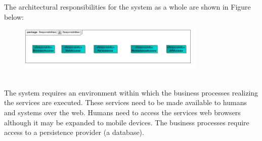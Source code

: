 The architectural responsibilities for the system as a whole are shown in Figure below:\\
\begin{figure}[ht!]
\begin{center}


\includegraphics[width=90mm]{../images/arch_resp.jpg}
\end{center}
\end{figure}\\
The system requires an environment within which the business processes realizing the services
are executed. These services need to be made available to humans and systems over the web. Humans need to access the services web browsers although it may be expanded to mobile devices. The business processes require access to a persistence provider (a database).